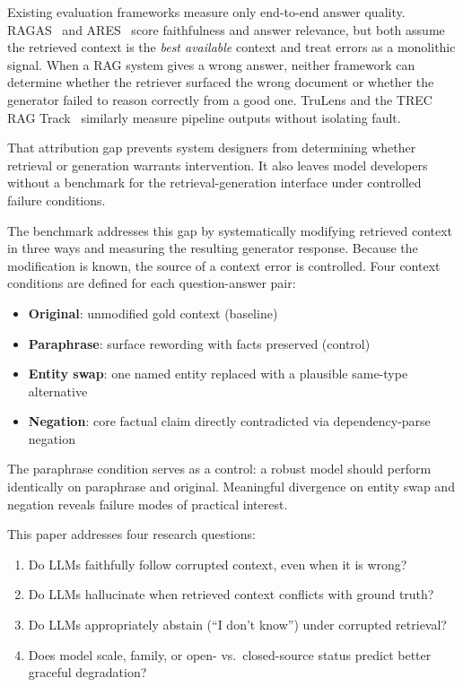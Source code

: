 \documentclass[11pt]{article}
\begin{document}
Existing evaluation frameworks measure only end-to-end answer quality. RAGAS~\cite{es2023ragas}
and ARES~\cite{saadfalcon2023ares} score faithfulness and answer relevance, but both
assume the retrieved context is the \emph{best available} context and treat errors as a
monolithic signal. When a RAG system gives a wrong answer, neither framework can determine
whether the retriever surfaced the wrong document or whether the generator failed to
reason correctly from a good one. TruLens and the TREC RAG Track~\cite{trec2024rag}
similarly measure pipeline outputs without isolating fault.

That attribution gap prevents system designers from determining whether retrieval or
generation warrants intervention. It also leaves model developers without a benchmark
for the retrieval-generation interface under controlled failure conditions.

The benchmark addresses this gap by systematically modifying retrieved context in three
ways and measuring the resulting generator response. Because the modification is known,
the source of a context error is controlled. Four context conditions are defined for each
question-answer pair:

\begin{itemize}[noitemsep]
  \item \textbf{Original}: unmodified gold context (baseline)
  \item \textbf{Paraphrase}: surface rewording with facts preserved (control)
  \item \textbf{Entity swap}: one named entity replaced with a plausible same-type alternative
  \item \textbf{Negation}: core factual claim directly contradicted via dependency-parse negation
\end{itemize}

The paraphrase condition serves as a control: a robust model should perform identically on
paraphrase and original. Meaningful divergence on entity swap and negation reveals failure
modes of practical interest.

This paper addresses four research questions:

\begin{enumerate}[noitemsep, label=\textbf{RQ\arabic*.}]
  \item Do LLMs faithfully follow corrupted context, even when it is wrong?
  \item Do LLMs hallucinate when retrieved context conflicts with ground truth?
  \item Do LLMs appropriately abstain (``I don't know'') under corrupted retrieval?
  \item Does model scale, family, or open- vs.\ closed-source status predict better
        graceful degradation?
\end{enumerate}
\end{document}
